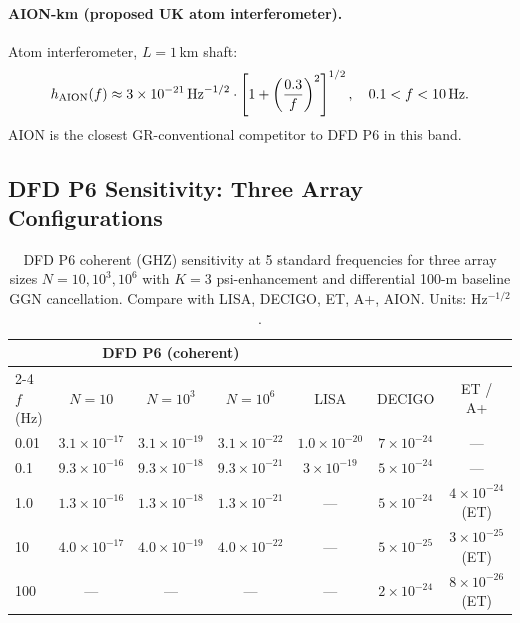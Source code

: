 \documentclass[11pt]{article}
\theoremstyle{definition}
\theoremstyle{remark}
\newcommand{\sqrtHz}{\,\mathrm{Hz}^{-1/2}}
\newcommand{\ee}[1]{\times10^{#1}}
\begin{document}
\paragraph{AION-km (proposed UK atom interferometer).}
Atom interferometer, $L = 1$\,km shaft:
\begin{equation}
h_{\rm AION}(f) \approx 3\ee{-21}\sqrtHz \cdot
\left[1 + \left(\frac{0.3}{f}\right)^{2}\right]^{1/2},
\quad 0.1 < f < 10\,\rm Hz.
\end{equation}
AION is the closest GR-conventional competitor to DFD P6 in this band.

\subsection{DFD P6 Sensitivity: Three Array Configurations}

\begin{table}[h]
\centering
\caption{DFD P6 coherent (GHZ) sensitivity at 5 standard frequencies
for three array sizes $N=10, 10^3, 10^6$ with $K=3$ psi-enhancement
and differential 100-m baseline GGN cancellation.
Compare with LISA, DECIGO, ET, A+, AION.
Units: Hz$^{-1/2}$.}
\label{tab:benchmark}
\begin{tabular}{@{}lcccccc@{}}
\toprule
 & \multicolumn{3}{c}{DFD P6 (coherent)} & & & \\
\cmidrule(lr){2-4}
$f$ (Hz) & $N=10$ & $N=10^3$ & $N=10^6$ & LISA & DECIGO & ET / A+ \\
\midrule
0.01  & $3.1\ee{-17}$ & $3.1\ee{-19}$ & $3.1\ee{-22}$ & $1.0\ee{-20}$ & $7\ee{-24}$ & --- \\
0.1   & $9.3\ee{-16}$ & $9.3\ee{-18}$ & $9.3\ee{-21}$ & $3\ee{-19}$ & $5\ee{-24}$ & --- \\
1.0   & $1.3\ee{-16}$ & $1.3\ee{-18}$ & $1.3\ee{-21}$ & --- & $5\ee{-24}$ & $4\ee{-24}$ (ET) \\
10    & $4.0\ee{-17}$ & $4.0\ee{-19}$ & $4.0\ee{-22}$ & --- & $5\ee{-25}$ & $3\ee{-25}$ (ET) \\
100   & ---          & ---           & ---          & --- & $2\ee{-24}$ & $8\ee{-26}$ (ET) \\
\bottomrule
\end{tabular}
\end{table}
\end{document}
